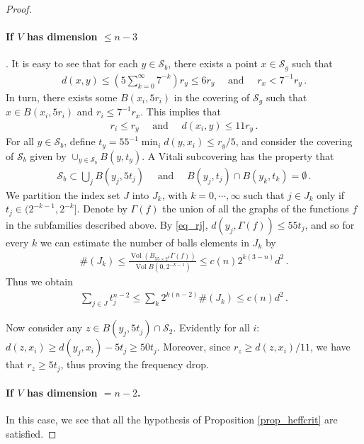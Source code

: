 \documentclass[11pt]{article}
\begin{document}
\begin{proof}
\paragraph{If $V$ has dimension $\leq n-3$}. It is easy to see that for each $y\in {\mathcal{S}}_b$, there exists a point $x\in {\mathcal{S}}_g$ such that
\begin{gather}
 d(x,y)\leq {\left({5\sum_{k=0}^\infty 7^{-k}}\right)}r_y \leq 6 r_y \quad \text{  and  } \quad r_x<7^{-1} r_y\, .
\end{gather}
In turn, there exists some $B(x_i,5r_i)$ in the covering of ${\mathcal{S}}_g$ such that $x\in B(x_i,5r_i)$ and $r_i\leq 7^{-1}r_x$. This implies that
\begin{gather}\label{eq_rj}
 r_i\leq r_y \quad \text{  and  } \quad d(x_i,y)\leq 11r_y\, .
\end{gather}
For all $y\in {\mathcal{S}}_b$, define $t_y=55^{-1}\min_i d(y,x_i)\leq r_y/5$, and consider the covering of ${\mathcal{S}}_b$ given by $\cup_{y\in {\mathcal{S}}_b} B(y,t_y)$. A Vitali subcovering has the property that
\begin{gather}
 {\mathcal{S}}_b\subset \bigcup_j B(y_j,5t_j) \quad \text{  and  }\quad B(y_j,t_j)\cap B(y_k,t_k)=\emptyset\, .
\end{gather}
We partition the index set $J$ into $J_k$, with $k=0,\cdots,\infty$ such that $j\in J_k$ only if $t_j\in (2^{-k-1},2^{-k}]$. Denote by $\Gamma(f)$ the union of all the graphs of the functions $f$ in the subfamilies described above. By \eqref{eq_rj}, $d(y_j,\Gamma(f))\leq 55t_j$, and so for every $k$ we can estimate the number of balls elements in $J_k$ by
\begin{gather}
 \#(J_k)\leq \frac{{\operatorname{Vol}}{\left({B_{55\times 2^k} \Gamma(f)}\right)} }{{\operatorname{Vol}} B(0,2^{-k-1})}\leq c(n) 2^{k(3-n)} d^2\, .
\end{gather}
Thus we obtain
\begin{gather}
 \sum_{j\in J} t_j^{n-2} \leq \sum _k 2^{k(n-2)} \# (J_k) \leq c(n)d^2\, .
\end{gather}

Now consider any $z\in B(y_j,5t_j)\cap {\mathcal{S}}_2$. Evidently for all $i$: $d(z,x_i)\geq d(y_j,x_i)-5t_j \geq 50 t_j $. Moreover, since $r_z\geq d(z,x_i)/11$, we have that $r_z\geq 5 t_j$, thus proving the frequency drop.

\paragraph{If $V$ has dimension $=n-2$.} In this case, we see that all the hypothesis of Proposition \ref{prop_heffcrit} are satisfied. 


\end{proof}
\end{document}
